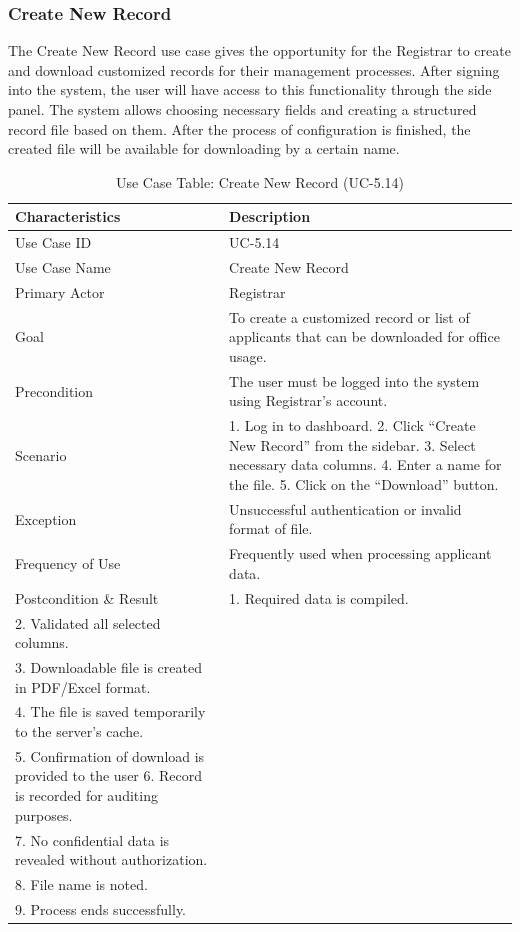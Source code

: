 \subsubsection{Create New Record}
The Create New Record use case gives the opportunity for the Registrar to create and download customized records for their management processes. After signing into the system, the user will have access to this functionality through the side panel. The system allows choosing necessary fields and creating a structured record file based on them. After the process of configuration is finished, the created file will be available for downloading by a certain name.
\begin{table}[H]
    \centering
    \small
    \renewcommand{\arraystretch}{1.4}
    \caption{Use Case Table: Create New Record (UC-5.14)}
    \label{tab:create-new-record-registrar}
    \begin{tabularx}{\textwidth}{|l|X|}
        \hline 
        \rowcolor[gray]{0.9} {Characteristics} & {Description} \\ \hline
        Use Case ID & UC-5.14 \\ \hline
        Use Case Name & Create New Record \\ \hline
        Primary Actor & Registrar \\ \hline
        Goal & To create a customized record or list of applicants that can be downloaded for office usage. \\ \hline
        Precondition & The user must be logged into the system using Registrar’s account. \\ \hline
        Scenario & 1. Log in to dashboard. 2. Click “Create New Record” from the sidebar. 3. Select necessary data columns. 4. Enter a name for the file. 5. Click on the “Download” button. \\ \hline
        Exception & Unsuccessful authentication or invalid format of file. \\ \hline
        Frequency of Use & Frequently used when processing applicant data. \\ \hline
        Postcondition \& Result & 
        1. Required data is compiled. \\
        2. Validated all selected columns. \\
        3. Downloadable file is created in PDF/Excel format. \\
        4. The file is saved temporarily to the server’s cache. \\
        5. Confirmation of download is provided to the user
        6. Record is recorded for auditing purposes. \\
	    7. No confidential data is revealed without authorization. \\
	    8. File name is noted. \\
	    9. Process ends successfully. \\ \hline
\end{tabularx}
\end{table}
\FloatBarrier